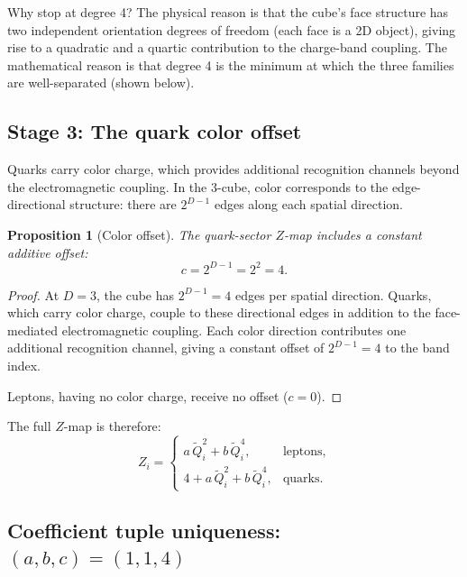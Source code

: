 \documentclass[11pt,a4paper]{article}
\newtheorem{proposition}[theorem]{Proposition}
\theoremstyle{definition}
\theoremstyle{remark}
\newcommand{\tildeQ}{\tilde{Q}}
\newcommand{\Zidx}{Z}
\begin{document}
\noindent
Why stop at degree 4?  The physical reason is that the cube's face structure
has two independent orientation degrees of freedom (each face is a 2D
object), giving rise to a quadratic and a quartic contribution to the
charge-band coupling.  The mathematical reason is that degree 4 is the
minimum at which the three families are well-separated (shown below).

\subsection{Stage 3: The quark color offset}

Quarks carry color charge, which provides additional recognition channels
beyond the electromagnetic coupling.  In the 3-cube, color corresponds to
the edge-directional structure: there are $2^{D-1}$ edges along each
spatial direction.

\begin{proposition}[Color offset]
\label{prop:color_offset}
The quark-sector $\Zidx$-map includes a constant additive offset:
\begin{equation}
  c = 2^{D-1} = 2^2 = 4.
  \label{eq:color_offset}
\end{equation}
\end{proposition}

\begin{proof}
At $D = 3$, the cube has $2^{D-1} = 4$ edges per spatial direction.
Quarks, which carry color charge, couple to these directional edges in
addition to the face-mediated electromagnetic coupling.  Each color
direction contributes one additional recognition channel, giving a
constant offset of $2^{D-1} = 4$ to the band index.

Leptons, having no color charge, receive no offset ($c = 0$).
\end{proof}

\noindent
The full $\Zidx$-map is therefore:
\begin{equation}
  \boxed{
  \Zidx_i =
  \begin{cases}
    a\,\tildeQ_i^2 + b\,\tildeQ_i^4, & \text{leptons}, \\[4pt]
    4 + a\,\tildeQ_i^2 + b\,\tildeQ_i^4, & \text{quarks}.
  \end{cases}}
  \label{eq:Z_full}
\end{equation}

\subsection{Coefficient tuple uniqueness: $(a, b, c) = (1, 1, 4)$}
\end{document}
